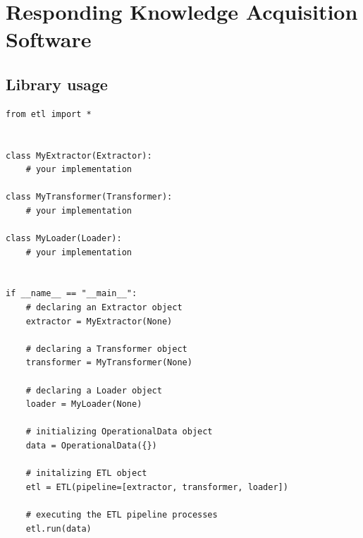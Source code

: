 \section{Responding Knowledge Acquisition Software}

\subsection{Library usage}
\label{prog:library}
\begin{lstlisting}
from etl import *


class MyExtractor(Extractor):
	# your implementation

class MyTransformer(Transformer):
	# your implementation

class MyLoader(Loader):
	# your implementation


if __name__ == "__main__":
	# declaring an Extractor object
	extractor = MyExtractor(None)

	# declaring a Transformer object
	transformer = MyTransformer(None)

	# declaring a Loader object
	loader = MyLoader(None)

	# initializing OperationalData object
	data = OperationalData({})

	# initalizing ETL object
	etl = ETL(pipeline=[extractor, transformer, loader])

	# executing the ETL pipeline processes
	etl.run(data)
\end{lstlisting}

